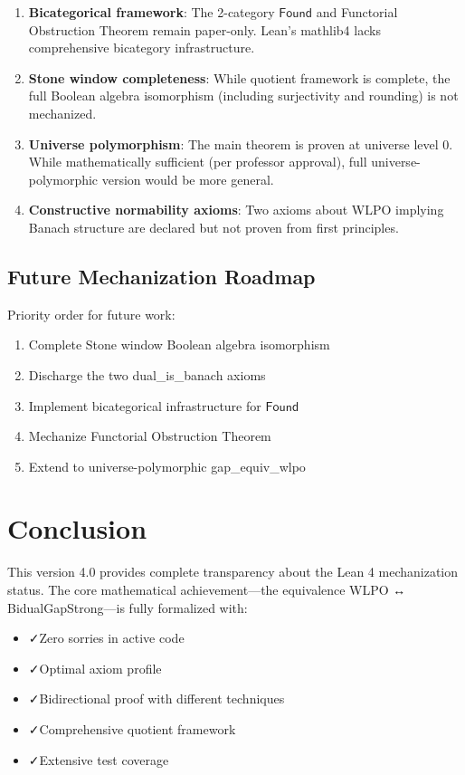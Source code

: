 \documentclass[11pt]{article}
\theoremstyle{definition}
\theoremstyle{remark}
\newcommand{\leanok}{\textcolor{green!70!black}{✓}}
\newcommand{\Found}{\mathsf{Found}}
\begin{document}
\begin{enumerate}
\item \textbf{Bicategorical framework}: The 2-category \(\Found\) and Functorial Obstruction Theorem remain paper-only. Lean's mathlib4 lacks comprehensive bicategory infrastructure.

\item \textbf{Stone window completeness}: While quotient framework is complete, the full Boolean algebra isomorphism (including surjectivity and rounding) is not mechanized.

\item \textbf{Universe polymorphism}: The main theorem is proven at universe level 0. While mathematically sufficient (per professor approval), full universe-polymorphic version would be more general.

\item \textbf{Constructive normability axioms}: Two axioms about WLPO implying Banach structure are declared but not proven from first principles.
\end{enumerate}

\subsection{Future Mechanization Roadmap}

\begin{mdframed}[style=roadmap]
Priority order for future work:
\begin{enumerate}
\item Complete Stone window Boolean algebra isomorphism
\item Discharge the two dual\_is\_banach axioms
\item Implement bicategorical infrastructure for \(\Found\)
\item Mechanize Functorial Obstruction Theorem
\item Extend to universe-polymorphic gap\_equiv\_wlpo
\end{enumerate}
\end{mdframed}

\section{Conclusion}\label{sec:conclusion}

This version 4.0 provides complete transparency about the Lean 4 mechanization status. The core mathematical achievement—the equivalence WLPO ↔ BidualGapStrong—is fully formalized with:
\begin{itemize}
\item \leanok Zero sorries in active code
\item \leanok Optimal axiom profile
\item \leanok Bidirectional proof with different techniques
\item \leanok Comprehensive quotient framework
\item \leanok Extensive test coverage
\end{itemize}
\end{document}
